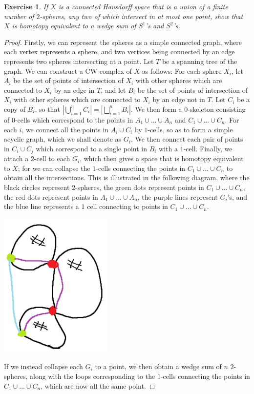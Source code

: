 \documentclass{article}
\newtheorem{exercise}[theorem]{Exercise}
\begin{document}
\begin{exercise}
If $X$ is a connected Hausdorff space that is a union of a finite number of $2$-spheres, any two of which intersect in at most one point, show that $X$ is homotopy equivalent to a wedge sum of $S^1$'s and $S^2$'s.
\end{exercise}
\begin{proof}
Firstly, we can represent the spheres as a simple connected graph, where each vertex represents a sphere, and two vertices being connected by an edge represents two spheres intersecting at a point. Let $T$ be a spanning tree of the graph. We can construct a CW complex of $X$ as follows: For each sphere $X_i$, let $A_i$ be the set of points of intersection of $X_i$ with other spheres which are connected to $X_i$ by an edge in $T$, and let $B_i$ be the set of points of intersection of $X_i$ with other spheres which are connected to $X_i$ by an edge not in $T$. Let $C_i$ be a copy of $B_i$, so that $\left|\bigcup_{i=1}^nC_i\right|=|\bigsqcup_{i=1}^nB_i|$. We then form a $0$-skeleton consisting of $0$-cells which correspond to the points in $A_1\cup...\cup A_n$ and $C_1\cup...\cup C_n$. For each $i$, we connect all the points in $A_i\cup C_i$ by $1$-cells, so as to form a simple acyclic graph, which we shall denote as $G_i$. We then connect each pair of points in $C_i\cup C_j$ which correspond to a single point in $B_i$ with a $1$-cell. Finally, we attach a $2$-cell to each $G_i$, which then gives a space that is homotopy equivalent to $X$; for we can collapse the $1$-cells connecting the points in $C_1\cup...\cup C_n$ to obtain all the intersections. This is illustrated in the following diagram, where the black circles represent $2$-spheres, the green dots represent points in $C_1\cup...\cup C_n$, the red dots represent points in $A_1\cup...\cup A_n$, the purple lines represent $G_i$'s, and the blue line represents a $1$ cell connecting to points in $C_1\cup...\cup C_n$.

\includegraphics[scale=0.5]{Screenshot (1361).png}

If we instead collapse each $G_i$ to a point, we then obtain a wedge sum of $n$ $2$-spheres, along with the loops corresponding to the $1$-cells connecting the points in $C_1\cup...\cup C_n$, which are now all the same point.
\end{proof}
\end{document}
